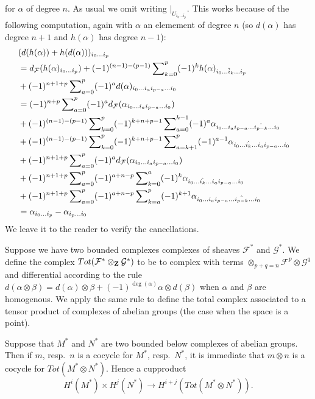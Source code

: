 for $\alpha$ of degree $n$. As usual we omit writing
$|_{U_{i_0\ldots i_p}}$. This works
because of the following computation, again with
$\alpha$ an elemement of degree $n$ (so $d(\alpha)$
has degree $n + 1$ and $h(\alpha)$ has degree $n-1$):
\begin{align*}
& (
d(h(\alpha)) + h(d(\alpha))
)_{i_0\ldots i_p}
\cr
& =
d_{\mathcal F}(h(\alpha)_{i_0\ldots i_p})
+
(-1)^{(n-1)-(p-1)}
\sum\nolimits_{k = 0}^p
(-1)^k
h(\alpha)_{i_0\ldots\hat i_k\ldots i_p}
\cr
& +
(-1)^{n + 1 + p}
\sum\nolimits_{a = 0}^p
(-1)^a
d(\alpha)_{i_0\ldots i_a i_{p-a} \ldots i_0}
\cr
& =
(-1)^{n + p}
\sum\nolimits_{a = 0}^p
(-1)^a
d_{\mathcal F}(\alpha_{i_0\ldots i_a i_{p-a} \ldots i_0})
\cr
& +
(-1)^{(n-1)-(p-1)}
\sum\nolimits_{k = 0}^p
(-1)^{k + n + p-1}
\sum\nolimits_{a = 0}^{k-1}
(-1)^a
\alpha_{i_0\ldots i_a i_{p-a}\ldots\hat{i_{p-k}}\ldots i_0}
\cr
& +
(-1)^{(n-1)-(p-1)}
\sum\nolimits_{k = 0}^p
(-1)^{k + n + p-1}
\sum\nolimits_{a = k + 1}^p
(-1)^{a-1}
\alpha_{i_0\ldots\hat{i_k}\ldots i_a i_{p-a}\ldots i_0}
\cr
& +
(-1)^{n + 1 + p}
\sum\nolimits_{a = 0}^p
(-1)^a
d_{\mathcal F}(\alpha_{i_0\ldots i_a i_{p-a} \ldots i_0})
\cr
& +
(-1)^{n + 1 + p}
\sum\nolimits_{a = 0}^p
(-1)^{a + n-p}
\sum\nolimits_{k = 0}^a
(-1)^k
\alpha_{i_0\ldots \hat{i_k}\ldots i_a i_{p-a}\ldots i_0}
\cr
& +
(-1)^{n + 1 + p}
\sum\nolimits_{a = 0}^p
(-1)^{a + n-p}
\sum\nolimits_{k = a}^p
(-1)^{k + 1}
\alpha_{i_0\ldots i_a i_{p-a}\ldots \hat{i_{p-k}}\ldots i_0}
\cr
& =
\alpha_{i_0 \ldots i_p} - \alpha_{i_p \ldots i_0}
\end{align*}
We leave it to the reader to verify the cancellations.


\medskip\noindent
Suppose we have two bounded complexes complexes of sheaves
${\mathcal F}^*$ and ${\mathcal G}^*$. We define the complex
$Tot({\mathcal F}^*\otimes_{\bf Z} {\mathcal G}^*)$
to be to complex with terms
$\otimes_{p + q = n} {\mathcal F}^p \otimes {\mathcal G}^q$
and differential according to the rule $d(\alpha \otimes \beta) =
d(\alpha)\otimes \beta + (-1)^{\deg(\alpha)} \alpha \otimes d(\beta)$
when $\alpha$ and $\beta$ are homogenous. We apply the same rule
to define the total complex associated to a tensor product of
complexes of abelian groups (the case when the space is a point).

\medskip\noindent
Suppose that $M^*$ and $N^*$ are two bounded below
complexes of abelian groups. Then if $m$, resp.\ $n$
is a cocycle for $M^*$, resp.\ $N^*$, it is immediate
that $m \otimes n$ is a cocycle for $Tot(M^*\otimes N^*)$.
Hence a cupproduct
$$
H^i(M^*) \times H^j(N^*) \to H^{i + j}(Tot(M^*\otimes N^*)).
$$


